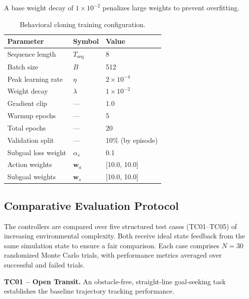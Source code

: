 \documentclass[12pt, a4paper]{article}
\begin{document}
A base weight decay of $1 \times 10^{-2}$ penalizes large weights to prevent overfitting.
\begin{table}[ht]
\centering
\caption{Behavioral cloning training configuration.}
\label{tab:train_config}
\begin{tabular}{lll}
\hline
Parameter                    & Symbol                     & Value \\
\hline
Sequence length              & $T_{\mathrm{seq}}$         & 8 \\
Batch size                   & $B$                        & 512 \\
Peak learning rate           & $\eta$                     & $2 \times 10^{-4}$ \\
Weight decay                 & $\lambda$                  & $1 \times 10^{-2}$ \\
Gradient clip                & ---                        & 1.0 \\
Warmup epochs                & ---                        & 5 \\
Total epochs                 & ---                        & 20 \\
Validation split             & ---                        & 10\% (by episode) \\
Subgoal loss weight          & $\alpha_s$                 & 0.1 \\
Action weights               & $\mathbf{w}_a$             & [10.0, 10.0] \\
Subgoal weights              & $\mathbf{w}_s$             & [10.0, 10.0] \\
\hline
\end{tabular}
\end{table}


\subsection{Comparative Evaluation Protocol}
\label{sec:eval_protocol}


The controllers are compared over five structured test cases (TC01--TC05) of increasing environmental complexity.
Both receive ideal state feedback from the same simulation state to ensure a fair comparison.
Each case comprises $N = 30$ randomized Monte Carlo trials, with performance metrics averaged over successful and failed trials.

\textbf{TC01 -- Open Transit.} An obstacle-free, straight-line goal-seeking task establishes the baseline trajectory tracking performance.
\end{document}
